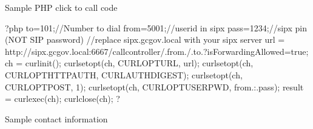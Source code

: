 \documentclass[letterpaper,10pt,english]{sphinxmanual}
\begin{document}
\begin{sphinxVerbatim}[commandchars=\\\{\}]





\end{sphinxVerbatim}

Sample PHP click to call code

\begin{sphinxVerbatim}[commandchars=\\\{\}]
\PYGZlt{}?php
\PYGZdl{}to=\PYGZdq{}101\PYGZdq{};//Number to dial
\PYGZdl{}from=\PYGZdq{}5001\PYGZdq{};//userid in sipx
\PYGZdl{}pass=\PYGZdq{}1234\PYGZdq{};//sipx pin (NOT SIP password)
//replace sipx.gcgov.local with your sipx server
\PYGZdl{}url = \PYGZdq{}http://sipx.gcgov.local:6667/callcontroller/\PYGZdq{}.\PYGZdl{}from.\PYGZdq{}/\PYGZdq{}.\PYGZdl{}to.\PYGZdq{}?isForwardingAllowed=true\PYGZdq{};
\PYGZdl{}ch = curl\PYGZus{}init();
curl\PYGZus{}setopt(\PYGZdl{}ch, CURLOPT\PYGZus{}URL, \PYGZdl{}url);
curl\PYGZus{}setopt(\PYGZdl{}ch, CURLOPT\PYGZus{}HTTPAUTH, CURLAUTH\PYGZus{}DIGEST);
curl\PYGZus{}setopt(\PYGZdl{}ch, CURLOPT\PYGZus{}POST, 1);
curl\PYGZus{}setopt(\PYGZdl{}ch, CURLOPT\PYGZus{}USERPWD, \PYGZdl{}from.\PYGZdq{}:\PYGZdq{}.\PYGZdl{}pass);
\PYGZdl{}result = curl\PYGZus{}exec(\PYGZdl{}ch);
curl\PYGZus{}close(\PYGZdl{}ch);
?\PYGZgt{}
\end{sphinxVerbatim}

Sample contact information
\end{document}
